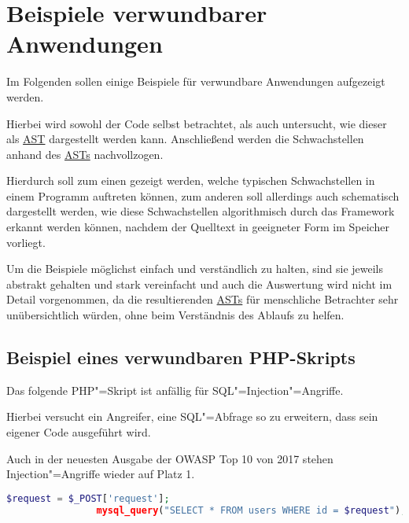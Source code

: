     \section{Beispiele verwundbarer Anwendungen}
        Im Folgenden sollen einige Beispiele für verwundbare Anwendungen aufgezeigt werden.

        Hierbei wird sowohl der Code selbst betrachtet,
        als auch untersucht,
        wie dieser als
        \hyperref[Der AST]{AST} dargestellt werden kann.
        Anschließend werden die Schwachstellen anhand des
        \hyperref[Der AST]{ASTs} nachvollzogen.

        Hierdurch soll zum einen gezeigt werden,
        welche typischen Schwachstellen in einem Programm auftreten können,
        zum anderen soll allerdings auch schematisch dargestellt werden,
        wie diese Schwachstellen algorithmisch durch das Framework erkannt werden können,
        nachdem der Quelltext in geeigneter Form im Speicher vorliegt.

        Um die Beispiele möglichst einfach und
        verständlich zu halten,
        sind sie jeweils abstrakt gehalten und
        stark vereinfacht und
        auch die Auswertung wird nicht im Detail vorgenommen,
        da die resultierenden
        \hyperref[Der AST]{ASTs} für menschliche Betrachter sehr unübersichtlich würden,
        ohne beim Verständnis des Ablaufs zu helfen.

        \subsection{Beispiel eines verwundbaren PHP-Skripts}\label{Beispiel eines verwundbaren PHP-Skripts}
            Das folgende
            \gls{PHP}"=Skript ist anfällig für
            \gls{SQL}"=Injection"=Angriffe.

            Hierbei versucht ein Angreifer,
            eine
            \gls{SQL}"=Abfrage so zu erweitern,
            dass sein eigener Code ausgeführt wird.

            Auch in der neuesten Ausgabe der
            \gls{OWASP} Top 10 von 2017 stehen Injection"=Angriffe wieder auf Platz 1.\cite[8]{Stock2017}

            \begin{lstlisting}[caption={Verwundbar für \gls{SQL} Injections}, label={lst:SQL_Injections}, gobble=16, language=php]
                $request = $_POST['request'];
                mysql_query("SELECT * FROM users WHERE id = $request");
            \end{lstlisting}

